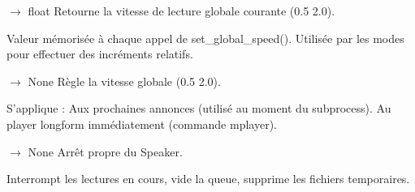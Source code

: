 \documentclass[letterpaper,10pt,french]{sphinxmanual}
\begin{document}
\begin{fulllineitems}
\begin{fulllineitems}
\end{fulllineitems}


\begin{fulllineitems}
\label{\detokenize{api/core:core.speaker.Speaker.get_speed}}
\pysigstartsignatures
\pysiglinewithargsret
{}
{}
{{ $\rightarrow$ float}}
\pysigstopsignatures
\sphinxAtStartPar
Retourne la vitesse de lecture globale courante (0.5 \textendash{} 2.0).

\sphinxAtStartPar
Valeur mémorisée à chaque appel de set\_global\_speed().
Utilisée par les modes pour effectuer des incréments relatifs.

\end{fulllineitems}


\begin{fulllineitems}
\label{\detokenize{api/core:core.speaker.Speaker.set_global_speed}}
\pysigstartsignatures
\pysiglinewithargsret
{}
{}
{{ $\rightarrow$ None}}
\pysigstopsignatures
\sphinxAtStartPar
Règle la vitesse globale (0.5 \textendash{} 2.0).

\sphinxAtStartPar
S’applique :
\sphinxhyphen{} Aux prochaines annonces (utilisé au moment du subprocess).
\sphinxhyphen{} Au player long\sphinxhyphen{}form immédiatement (commande mplayer).

\end{fulllineitems}


\begin{fulllineitems}
\label{\detokenize{api/core:core.speaker.Speaker.close}}
\pysigstartsignatures
\pysiglinewithargsret
{}
{}
{{ $\rightarrow$ None}}
\pysigstopsignatures
\sphinxAtStartPar
Arrêt propre du Speaker.

\sphinxAtStartPar
Interrompt les lectures en cours, vide la queue, supprime
les fichiers temporaires.

\end{fulllineitems}


\end{fulllineitems}
\end{document}
